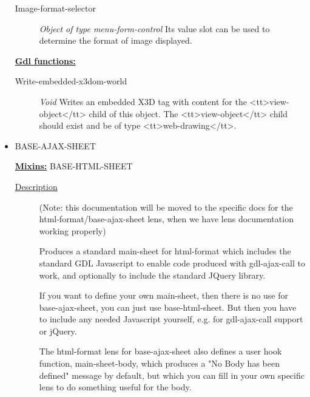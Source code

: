 \documentclass [11pt]{book}
\begin{document}
\begin{itemize}
\begin{description}
\item [Image-format-selector]
\emph{Object of type menu-form-control} Its value slot can be used to determine the format of image displayed.


\end{description}






\textbf{
\underline{Gdl functions:}}

\begin{description}

\item [Write-embedded-x3dom-world]
\emph{Void} Writes an embedded X3D tag with content for the <tt>view-object</tt> child of this object.
The <tt>view-object</tt> child should exist and be of type <tt>web-drawing</tt>.


\end{description}







\item {}BASE-AJAX-SHEET


\textbf{
\underline{Mixins:}} BASE-HTML-SHEET





\begin{description}

\item [
\underline{Description}]


(Note: this documentation will be moved
to the specific docs for the html-format/base-ajax-sheet lens, when 
we have lens documentation working properly)

Produces a standard main-sheet for html-format which includes the
standard GDL Javascript to enable code produced with gdl-ajax-call to
work, and optionally to include the standard JQuery library.

If you want to define your own main-sheet, then there is no use for
base-ajax-sheet, you can just use base-html-sheet. But then you have
to include any needed Javascript yourself, e.g. for gdl-ajax-call
support or jQuery.

The html-format lens for base-ajax-sheet also defines a user hook function,
main-sheet-body, which produces a "No Body has been defined" message by default, 
but which you can fill in your own specific lens to do something useful for the body.




\end{description}
\end{itemize}
\end{document}
